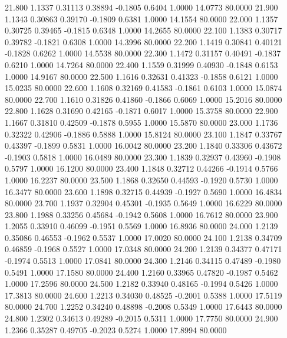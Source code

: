   21.800   1.1337   0.31113   0.38894  -0.1805   0.6404   1.0000  14.0773  80.0000
  21.900   1.1343   0.30863   0.39170  -0.1809   0.6381   1.0000  14.1554  80.0000
  22.000   1.1357   0.30725   0.39465  -0.1815   0.6348   1.0000  14.2655  80.0000
  22.100   1.1383   0.30717   0.39782  -0.1821   0.6308   1.0000  14.3996  80.0000
  22.200   1.1419   0.30841   0.40121  -0.1828   0.6262   1.0000  14.5538  80.0000
  22.300   1.1472   0.31157   0.40491  -0.1837   0.6210   1.0000  14.7264  80.0000
  22.400   1.1559   0.31999   0.40930  -0.1848   0.6153   1.0000  14.9167  80.0000
  22.500   1.1616   0.32631   0.41323  -0.1858   0.6121   1.0000  15.0235  80.0000
  22.600   1.1608   0.32169   0.41583  -0.1861   0.6103   1.0000  15.0874  80.0000
  22.700   1.1610   0.31826   0.41860  -0.1866   0.6069   1.0000  15.2016  80.0000
  22.800   1.1628   0.31690   0.42165  -0.1871   0.6017   1.0000  15.3758  80.0000
  22.900   1.1667   0.31810   0.42509  -0.1878   0.5955   1.0000  15.5870  80.0000
  23.000   1.1736   0.32322   0.42906  -0.1886   0.5888   1.0000  15.8124  80.0000
  23.100   1.1847   0.33767   0.43397  -0.1899   0.5831   1.0000  16.0042  80.0000
  23.200   1.1840   0.33306   0.43672  -0.1903   0.5818   1.0000  16.0489  80.0000
  23.300   1.1839   0.32937   0.43960  -0.1908   0.5797   1.0000  16.1200  80.0000
  23.400   1.1848   0.32712   0.44266  -0.1914   0.5766   1.0000  16.2237  80.0000
  23.500   1.1868   0.32650   0.44593  -0.1920   0.5730   1.0000  16.3477  80.0000
  23.600   1.1898   0.32715   0.44939  -0.1927   0.5690   1.0000  16.4834  80.0000
  23.700   1.1937   0.32904   0.45301  -0.1935   0.5649   1.0000  16.6229  80.0000
  23.800   1.1988   0.33256   0.45684  -0.1942   0.5608   1.0000  16.7612  80.0000
  23.900   1.2055   0.33910   0.46099  -0.1951   0.5569   1.0000  16.8936  80.0000
  24.000   1.2139   0.35086   0.46553  -0.1962   0.5537   1.0000  17.0020  80.0000
  24.100   1.2138   0.34709   0.46859  -0.1968   0.5527   1.0000  17.0348  80.0000
  24.200   1.2139   0.34377   0.47171  -0.1974   0.5513   1.0000  17.0841  80.0000
  24.300   1.2146   0.34115   0.47489  -0.1980   0.5491   1.0000  17.1580  80.0000
  24.400   1.2160   0.33965   0.47820  -0.1987   0.5462   1.0000  17.2596  80.0000
  24.500   1.2182   0.33940   0.48165  -0.1994   0.5426   1.0000  17.3813  80.0000
  24.600   1.2213   0.34030   0.48525  -0.2001   0.5388   1.0000  17.5119  80.0000
  24.700   1.2252   0.34240   0.48898  -0.2008   0.5349   1.0000  17.6443  80.0000
  24.800   1.2302   0.34613   0.49289  -0.2015   0.5311   1.0000  17.7750  80.0000
  24.900   1.2366   0.35287   0.49705  -0.2023   0.5274   1.0000  17.8994  80.0000
